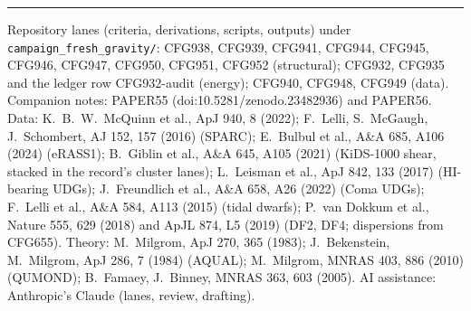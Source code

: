 \documentclass[10pt]{article}
\begin{document}
\vspace{2pt}\hrule\vspace{2pt}
{\footnotesize
Repository lanes (criteria, derivations, scripts, outputs) under \texttt{campaign\_fresh\_gravity/}: CFG938, CFG939, CFG941, CFG944, CFG945, CFG946, CFG947, CFG950, CFG951, CFG952 (structural); CFG932, CFG935 and the ledger row CFG932-audit (energy); CFG940, CFG948, CFG949 (data). Companion notes: PAPER55 (doi:10.5281/zenodo.23482936) and PAPER56.
Data: K.~B.~W.~McQuinn et al., ApJ 940, 8 (2022); F.~Lelli, S.~McGaugh, J.~Schombert, AJ 152, 157 (2016) (SPARC); E.~Bulbul et al., A\&A 685, A106 (2024) (eRASS1); B.~Giblin et al., A\&A 645, A105 (2021) (KiDS-1000 shear, stacked in the record's cluster lanes); L.~Leisman et al., ApJ 842, 133 (2017) (HI-bearing UDGs); J.~Freundlich et al., A\&A 658, A26 (2022) (Coma UDGs); F.~Lelli et al., A\&A 584, A113 (2015) (tidal dwarfs); P.~van Dokkum et al., Nature 555, 629 (2018) and ApJL 874, L5 (2019) (DF2, DF4; dispersions from CFG655).
Theory: M.~Milgrom, ApJ 270, 365 (1983); J.~Bekenstein, M.~Milgrom, ApJ 286, 7 (1984) (AQUAL); M.~Milgrom, MNRAS 403, 886 (2010) (QUMOND); B.~Famaey, J.~Binney, MNRAS 363, 603 (2005).
AI assistance: Anthropic's Claude (lanes, review, drafting).}
\end{document}
